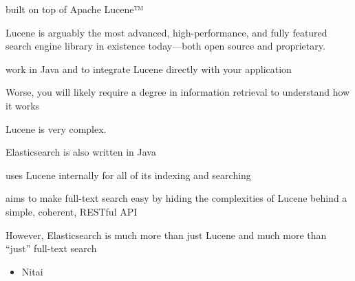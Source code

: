 
built on top of Apache Lucene™

Lucene is arguably the most advanced, high-performance, and fully featured search engine library in existence today—both open source and proprietary.

work in Java and to integrate Lucene directly with your application

Worse, you will likely require a degree in information retrieval to understand how it works

Lucene is very complex.

Elasticsearch is also written in Java

uses Lucene internally for all of its indexing and searching

aims to make full-text search easy by hiding the complexities of Lucene behind a simple, coherent, RESTful API

However, Elasticsearch is much more than just Lucene and much more than “just” full-text search
\begin{itemize}
	\item Nitai
\end{itemize}
